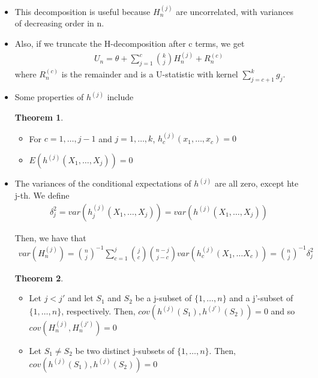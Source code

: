 \documentclass{article}
\theoremstyle{definition}
\newtheorem{theorem}{Theorem}
\numberwithin{Def}{section}
\begin{document}
\begin{itemize}
    \item This decomposition is useful because $H_n^{(j)}$ are uncorrelated, with variances of decreasing order in n. 
    \item Also, if we truncate the H-decomposition after c terms, we get 
    \begin{align*}
        U_n = \theta + \sum_{j=1}^c {k \choose j}H_n^{(j)} + R_n^{(c)}
    \end{align*}
    where $R_n^{(c)}$ is the remainder and is a U-statistic with kernel $\sum_{j=c+1}^k g_j$.
    
    \item Some properties of $h^{(j)}$ include
    \begin{theorem}
    \begin{itemize}
        \item For $c = 1, \dotsc, j-1$ and $j = 1, \dotsc, k$, $h_c^{(j)}(x_1, \dotsc, x_c) = 0$
        \item $E(h^{(j)}(X_1, \dotsc, X_j)) = 0$
    \end{itemize}
    \end{theorem}
    
    \item The variances of the conditional expectations of $h^{(j)}$ are all zero, except hte j-th. We define \begin{align}
        \delta_j^2 = var(h_j^{(j)}(X_1, \dotsc, X_j)) = var(h^{(j)}(X_1, \dotsc, X_j))
    \end{align}
    
    Then, we have that 
    \begin{align}
        var(H_n^{(j)}) = {n \choose j}^{-1}\sum_{c=1}^j {j \choose c}{n-j \choose j-c}var(h_c^{(j)}(X_1, \dotsc X_c)) = {n \choose j}^{-1}\delta_j^2
    \end{align}
    
    \begin{theorem}
    \begin{itemize}
        \item Let $j <j'$ and let $S_1$ and $S_2$ be a j-subset of $\{1, \dotsc, n\}$ and a j'-subset of $\{1, \dotsc, n\}$, respectively. Then, $cov(h^{(j)}(S_1), h^{(j')}(S_2)) = 0$ and so $cov(H_n^{(j)}, H_n^{(j')}) = 0$
        \item Let $S_1 \neq S_2$ be two distinct j-subsets of $\{1, \dotsc, n\}$. Then, $cov(h^{(j)}(S_1), h^{(j)}(S_2)) = 0$
    \end{itemize}
    \end{theorem}
    



\end{itemize}
\end{document}
